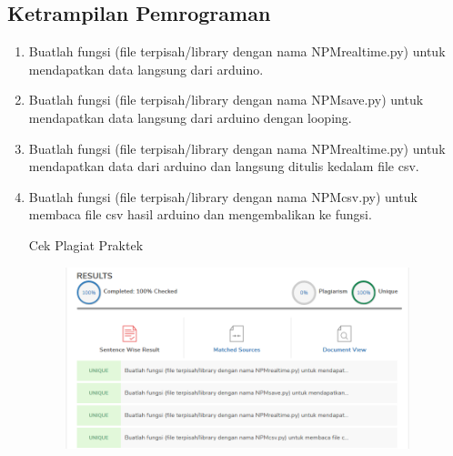 \subsection{Ketrampilan Pemrograman}
\begin{enumerate}
    \item Buatlah  fungsi  (file  terpisah/library  dengan  nama  NPMrealtime.py)  untuk mendapatkan data langsung dari arduino.
    
    
    \item Buatlah fungsi (file terpisah/library dengan nama NPMsave.py) untuk mendapatkan data langsung dari arduino dengan looping.
    
    
    \item Buatlah  fungsi  (file  terpisah/library  dengan  nama  NPMrealtime.py)  untuk mendapatkan data dari arduino dan langsung ditulis kedalam file csv.
    
    
    \item Buatlah fungsi (file terpisah/library dengan nama NPMcsv.py) untuk membaca file csv hasil arduino dan mengembalikan ke fungsi.
    
    \par Cek Plagiat Praktek
    \begin{figure}[!h]
	\includegraphics[width=10cm]{figures/5/1174077/praktek/cekpraktek.png}
	\centering
    \end{figure}
\end{enumerate}
